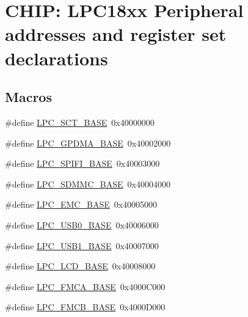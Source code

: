 \hypertarget{group___p_e_r_i_p_h__18_x_x___b_a_s_e}{}\section{C\+H\+IP\+: L\+P\+C18xx Peripheral addresses and register set declarations}
\label{group___p_e_r_i_p_h__18_x_x___b_a_s_e}
\subsection*{Macros}
\begin{DoxyCompactItemize}
\item 
\#define \hyperlink{group___p_e_r_i_p_h__18_x_x___b_a_s_e_gad39ca0e94488b4bee5510b2e8bc5a708}{L\+P\+C\+\_\+\+S\+C\+T\+\_\+\+B\+A\+SE}~0x40000000
\item 
\#define \hyperlink{group___p_e_r_i_p_h__18_x_x___b_a_s_e_ga51ba8e3f33730fa2b78be3f892d8c278}{L\+P\+C\+\_\+\+G\+P\+D\+M\+A\+\_\+\+B\+A\+SE}~0x40002000
\item 
\#define \hyperlink{group___p_e_r_i_p_h__18_x_x___b_a_s_e_gad284a5971366e0a8b5fe9881fdb9aa0c}{L\+P\+C\+\_\+\+S\+P\+I\+F\+I\+\_\+\+B\+A\+SE}~0x40003000
\item 
\#define \hyperlink{group___p_e_r_i_p_h__18_x_x___b_a_s_e_ga4175c6e418d0b209c42f789cfa9ff32b}{L\+P\+C\+\_\+\+S\+D\+M\+M\+C\+\_\+\+B\+A\+SE}~0x40004000
\item 
\#define \hyperlink{group___p_e_r_i_p_h__18_x_x___b_a_s_e_ga52f586bf3c6855ad4ef03b1fee3f2f0d}{L\+P\+C\+\_\+\+E\+M\+C\+\_\+\+B\+A\+SE}~0x40005000
\item 
\#define \hyperlink{group___p_e_r_i_p_h__18_x_x___b_a_s_e_ga41d15fd328f821807d202d6c9feb096c}{L\+P\+C\+\_\+\+U\+S\+B0\+\_\+\+B\+A\+SE}~0x40006000
\item 
\#define \hyperlink{group___p_e_r_i_p_h__18_x_x___b_a_s_e_ga72922dbb8f7e3016015922b225773710}{L\+P\+C\+\_\+\+U\+S\+B1\+\_\+\+B\+A\+SE}~0x40007000
\item 
\#define \hyperlink{group___p_e_r_i_p_h__18_x_x___b_a_s_e_gae1746cd618a1eb4f24f95255594f159a}{L\+P\+C\+\_\+\+L\+C\+D\+\_\+\+B\+A\+SE}~0x40008000
\item 
\#define \hyperlink{group___p_e_r_i_p_h__18_x_x___b_a_s_e_gaf59ae457b89f9991f1528a5625234445}{L\+P\+C\+\_\+\+F\+M\+C\+A\+\_\+\+B\+A\+SE}~0x4000\+C000
\item 
\#define \hyperlink{group___p_e_r_i_p_h__18_x_x___b_a_s_e_ga9c9492ce5a1b5e99d6500db256f020c6}{L\+P\+C\+\_\+\+F\+M\+C\+B\+\_\+\+B\+A\+SE}~0x4000\+D000

\end{DoxyCompactItemize}

